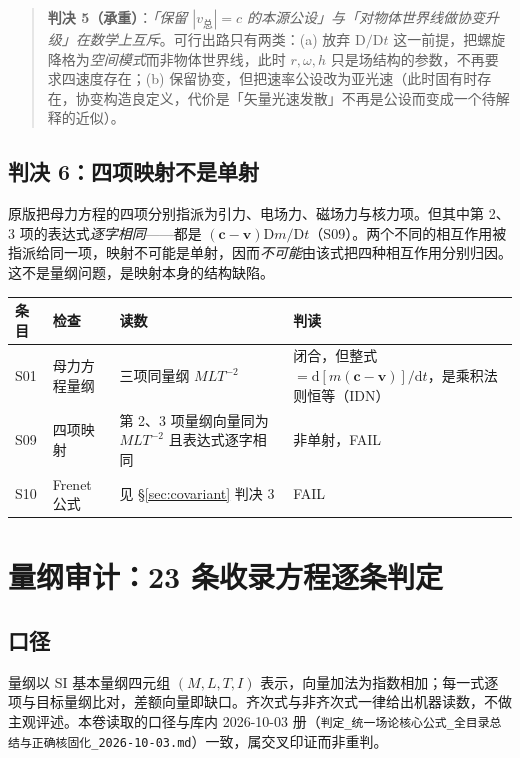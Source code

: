 \documentclass[UTF8,fontset=fandol,11pt]{ctexart}
\newcommand{\dd}{\mathrm{d}}
\newcommand{\DD}{\mathrm{D}}
\newcommand{\bx}{\boldsymbol}
\newcommand{\code}[1]{\texttt{#1}}
\begin{document}
\begin{quote}
\textbf{判决 5（承重）}：\emph{「保留 $|v_{\text{总}}|=c$ 的本源公设」与「对物体世界线做协变升级」在数学上互斥}。可行出路只有两类：(a) 放弃 $\DD/\DD t$ 这一前提，把螺旋降格为\emph{空间模式}而非物体世界线，此时 $r,\omega,h$ 只是场结构的参数，不再要求四速度存在；(b) 保留协变，但把速率公设改为亚光速（此时固有时存在，协变构造良定义，代价是「矢量光速发散」不再是公设而变成一个待解释的近似）。
\end{quote}

\subsection{判决 6：四项映射不是单射}
原版把母力方程的四项分别指派为引力、电场力、磁场力与核力项。但其中第 2、3 项的表达式\emph{逐字相同}——都是 $(\bx c-\bx v)\DD m/\DD t$（S09）。两个不同的相互作用被指派给同一项，映射不可能是单射，因而\emph{不可能}由该式把四种相互作用分别归因。这不是量纲问题，是映射本身的结构缺陷。

\begin{center}
\begin{tabular}{llll}
\toprule
条目 & 检查 & 读数 & 判读 \\
\midrule
S01 & 母力方程量纲 & 三项同量纲 $M L T^{-2}$ & 闭合，但整式 $=\dd[m(\bx c-\bx v)]/\dd t$，是乘积法则恒等（IDN） \\
S09 & 四项映射 & 第 2、3 项量纲向量同为 $M L T^{-2}$ 且表达式逐字相同 & 非单射，FAIL \\
S10 & Frenet 公式 & 见 \S\ref{sec:covariant} 判决 3 & FAIL \\
\bottomrule
\end{tabular}
\end{center}

\section{量纲审计：23 条收录方程逐条判定}
\label{sec:dim}

\subsection{口径}
量纲以 SI 基本量纲四元组 $(M,L,T,I)$ 表示，向量加法为指数相加；每一式逐项与目标量纲比对，差额向量即缺口。齐次式与非齐次式一律给出机器读数，不做主观评述。本卷读取的口径与库内 2026-10-03 册（\code{判定\_统一场论核心公式\_全目录总结与正确核固化\_2026-10-03.md}）一致，属交叉印证而非重判。
\end{document}
